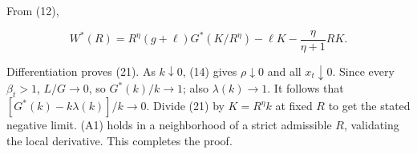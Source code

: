 \documentclass[
  11pt,
]{article}
\begin{document}
From (12),

\[W^*(R)=R^\eta(g+\ell)G^*(K/R^\eta)-\ell K-\frac{\eta}{\eta+1}RK.\]

Differentiation proves (21). As \(k\downarrow0\), (14) gives
\(\rho\downarrow0\) and all \(x_t\downarrow0\). Since every
\(\beta_t>1\), \(L/G\to0\), so \(G^*(k)/k\to1\); also
\(\lambda(k)\to1\). It follows that \([G^*(k)-k\lambda(k)]/k\to0\).
Divide (21) by \(K=R^\eta k\) at fixed \(R\) to get the stated negative
limit. (A1) holds in a neighborhood of a strict admissible \(R\),
validating the local derivative. This completes the proof.
\end{document}
